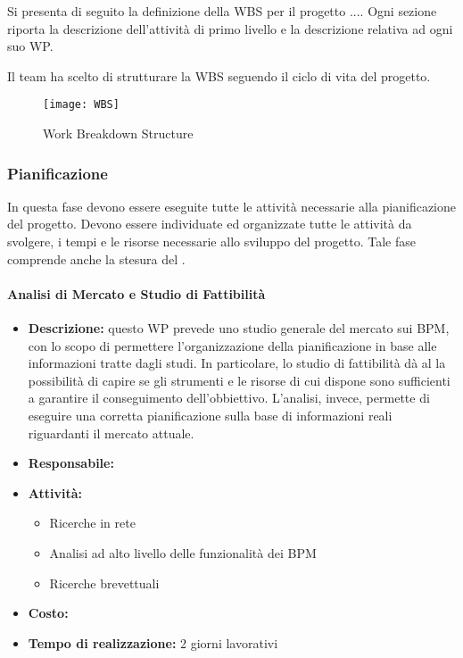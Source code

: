 Si presenta di seguito la definizione della WBS per il progetto ....%
Ogni sezione riporta la descrizione dell'attività di primo livello e la descrizione relativa ad ogni suo WP. 

		Il team ha scelto di strutturare la WBS seguendo il ciclo di vita del progetto.
		\begin{figure}[!h]
  		\texttt{[image: WBS]}
		\caption{Work Breakdown Structure}
		\end{figure}

\clearpage


		\subsubsection{Pianificazione}
		In questa fase devono essere eseguite tutte le attività necessarie alla pianificazione del progetto.
		Devono essere individuate ed organizzate tutte le attività da svolgere, i tempi e le risorse necessarie allo sviluppo del progetto. Tale fase comprende anche la stesura del .
		
		\paragraph{Analisi di Mercato e Studio di Fattibilità}

		\begin{itemize}
		\item{\bfseries Descrizione:} 
		questo WP prevede uno studio generale del mercato sui  BPM, con lo scopo di permettere l'organizzazione della pianificazione in base alle informazioni tratte dagli studi.
In particolare, lo studio di fattibilità dà al  la possibilità di capire se gli strumenti e le risorse di cui dispone sono sufficienti a garantire il conseguimento dell'obbiettivo.
L'analisi, invece, permette di eseguire una corretta pianificazione sulla base di informazioni reali riguardanti il mercato attuale. 
		\item {\bfseries Responsabile:}
		\item  {\bfseries Attività:}
			\begin{itemize}
				\item Ricerche in rete
				\item Analisi ad alto livello delle funzionalità dei  BPM
				\item Ricerche brevettuali
			\end{itemize}
		\item  {\bfseries Costo:}
		\item  {\bfseries Tempo di realizzazione: }2 giorni lavorativi
		\end{itemize}



